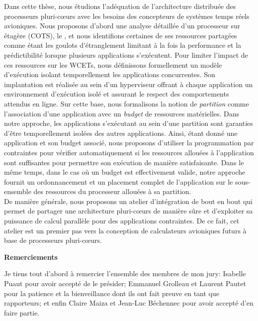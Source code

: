 \documentclass[main.tex]{subfiles}
\begin{document}
Dans cette thèse, nous étudions l'adéquation de l'architecture distribuée des processeurs pluri-c\oe{}urs avec les besoins des concepteurs de systèmes temps réels avioniques. Nous proposons d'abord une analyse détaillée d'un processeur sur étagère (COTS), le \mppalong, et nous identifions certaines de ses ressources partagées comme étant les goulots d'étranglement limitant à la fois la performance et la prédictibilité lorsque plusieurs applications s'exécutent. 
Pour limiter l'impact de ces ressources sur les WCETs, nous définissons formellement un modèle d'exécution isolant temporellement les applications concurrentes. 
Son implantation est réalisée au sein d’un hyperviseur offrant à chaque application un environnement d'exécution isolé et assurant le respect des comportements attendus en ligne.
Sur cette base, nous formalisons la notion de \emph{partition} comme l'association d'une application avec un \emph{budget} de ressources matérielles. Dans notre approche, les applications s'exécutant au sein d'une partition sont garanties d'être temporellement isolées des autres applications. Ainsi, étant donné une application et son budget associé, nous proposons d'utiliser la programmation par contraintes pour vérifier automatiquement si les ressources allouées à l'application sont suffisantes pour permettre son exécution de manière satisfaisante. Dans le même temps, dans le cas où un budget est effectivement valide, notre approche fournit un ordonnancement et un placement complet de l'application sur le sous-ensemble des ressources du processeur allouées à sa partition.\\

De manière générale, nous proposons un atelier d'intégration de bout en bout qui permet de partager une architecture pluri-c\oe{}urs de manière sûre et d'exploiter sa puissance de calcul parallèle pour des applications contraintes. De ce fait, cet atelier est un premier pas vers la conception de calculateurs avioniques futurs à base de processeurs pluri-c\oe{}urs.

\cleardoublepage


\begin{center} \LARGE \bf
Remerciements
\vspace{10mm} \end{center}


Je tiens tout d'abord à remercier l'ensemble des membres de mon jury: Isabelle Puaut pour avoir accepté de le présider;  Emmanuel Grolleau et Laurent Pautet pour la patience et la bienveillance dont ils ont fait preuve en tant que rapporteurs; et enfin Claire Maiza et Jean-Luc Béchennec pour avoir accepté d'en faire partie. \\
\end{document}
